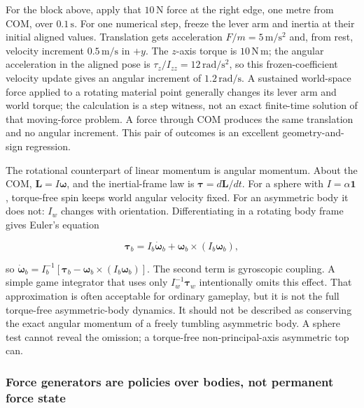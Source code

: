 For the block above, apply that \(10\,\mathrm N\) force at the right edge, one metre from COM, over \(0.1\,\mathrm s\). For one numerical step, freeze the lever arm and inertia at their initial aligned values. Translation gets acceleration \(F/m=5\,\mathrm{m/s^2}\) and, from rest, velocity increment \(0.5\,\mathrm{m/s}\) in \(+y\). The \(z\)-axis torque is \(10\,\mathrm{N\,m}\); the angular acceleration in the aligned pose is \(\tau_z/I_{zz}=12\,\mathrm{rad/s^2}\), so this frozen-coefficient velocity update gives an angular increment of \(1.2\,\mathrm{rad/s}\). A sustained world-space force applied to a rotating material point generally changes its lever arm and world torque; the calculation is a step witness, not an exact finite-time solution of that moving-force problem. A force through COM produces the same translation and no angular increment. This pair of outcomes is an excellent geometry-and-sign regression.

The rotational counterpart of linear momentum is angular momentum. About the COM, \(\mathbf L=I\boldsymbol\omega\), and the inertial-frame law is \(\boldsymbol\tau=d\mathbf L/dt\). For a sphere with \(I=\alpha\mathbf1\), torque-free spin keeps world angular velocity fixed. For an asymmetric body it does not: \(I_w\) changes with orientation. Differentiating in a rotating body frame gives Euler's equation

\[
\boldsymbol\tau_b=I_b\dot{\boldsymbol\omega}_b+\boldsymbol\omega_b\times(I_b\boldsymbol\omega_b),
\]

so \(\dot{\boldsymbol\omega}_b=I_b^{-1}[\boldsymbol\tau_b-\boldsymbol\omega_b\times(I_b\boldsymbol\omega_b)]\). The second term is gyroscopic coupling. A simple game integrator that uses only \(I_w^{-1}\boldsymbol\tau_w\) intentionally omits this effect. That approximation is often acceptable for ordinary gameplay, but it is not the full torque-free asymmetric-body dynamics. It should not be described as conserving the exact angular momentum of a freely tumbling asymmetric body. A sphere test cannot reveal the omission; a torque-free non-principal-axis asymmetric top can.

\subsubsection{Force generators are policies over bodies, not permanent force state}\label{06-engine-ii-ch034-force-generators-are-policies-over-bodies-not-permanent-force-state}

\hypertarget{06-engine-ii-ch034-force-generators-are-policies-over-bodies-not-permanent-force-state}{}

